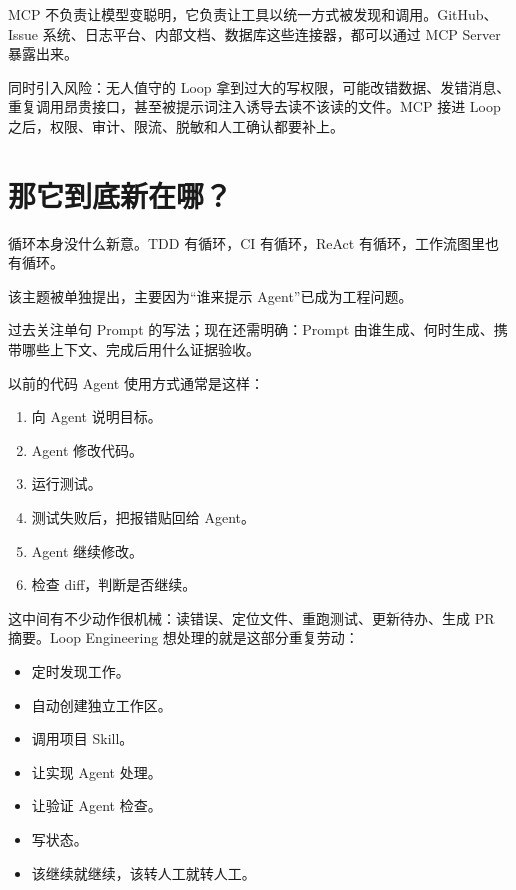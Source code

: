 \documentclass[9pt,a4paper,twocolumn]{ctexart}
\begin{document}
MCP 不负责让模型变聪明，它负责让工具以统一方式被发现和调用。GitHub、Issue 系统、日志平台、内部文档、数据库这些连接器，都可以通过 MCP Server 暴露出来。



同时引入风险：无人值守的 Loop 拿到过大的写权限，可能改错数据、发错消息、重复调用昂贵接口，甚至被提示词注入诱导去读不该读的文件。MCP 接进 Loop 之后，权限、审计、限流、脱敏和人工确认都要补上。



\section*{那它到底新在哪？}


循环本身没什么新意。TDD 有循环，CI 有循环，ReAct 有循环，工作流图里也有循环。



该主题被单独提出，主要因为“谁来提示 Agent”已成为工程问题。



过去关注单句 Prompt 的写法；现在还需明确：Prompt 由谁生成、何时生成、携带哪些上下文、完成后用什么证据验收。



以前的代码 Agent 使用方式通常是这样：


\begin{enumerate}[itemsep=1pt, topsep=2pt]
  \item 向 Agent 说明目标。
  \item Agent 修改代码。
  \item 运行测试。
  \item 测试失败后，把报错贴回给 Agent。
  \item Agent 继续修改。
  \item 检查 diff，判断是否继续。
\end{enumerate}


这中间有不少动作很机械：读错误、定位文件、重跑测试、更新待办、生成 PR 摘要。Loop Engineering 想处理的就是这部分重复劳动：


\begin{itemize}[itemsep=1pt, topsep=2pt]
  \item 定时发现工作。
  \item 自动创建独立工作区。
  \item 调用项目 Skill。
  \item 让实现 Agent 处理。
  \item 让验证 Agent 检查。
  \item 写状态。
  \item 该继续就继续，该转人工就转人工。
\end{itemize}
\end{document}
